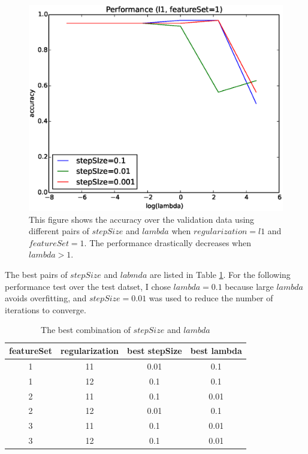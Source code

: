 \begin{figure}[hbtp]
\centering
\includegraphics[width=150mm]{performance_hyperparameter}
\caption{This figure shows the accuracy over the validation data using different pairs of $stepSize$ and $lambda$ when $regularization=l1$ and $featureSet=1$. The performance drastically decreases when $lambda > 1$.}
\label{fig:performance_hyperparameter}
\end{figure}

The best pairs of $stepSize$ and $labmda$ are listed in Table \ref{tab:best_hyperparameters}. For the following performance test over the test datset, I chose $lambda=0.1$ because large $lambda$ avoids overfitting, and $stepSize=0.01$ was used to reduce the number of iterations to converge.

\begin{table}[htb]
  \begin{center}
  \begin{tabular}{|c|c||c|c|} \hline
    featureSet & regularization & best stepSize & best  lambda \\ \hline
    1 & 11 & 0.01 & 0.1 \\ \hline
    1 & 12 & 0.1 & 0.1 \\ \hline
    2 & 11 & 0.1 & 0.01 \\ \hline
    2 & 12 & 0.01 & 0.1 \\ \hline
    3 & 11 & 0.1 & 0.01 \\ \hline
    3 & 12 & 0.1 & 0.01 \\ \hline
  \end{tabular}
  \caption{The best combination of $stepSize$ and $lambda$}
  \label{tab:best_hyperparameters}
  \end{center}
\end{table}

